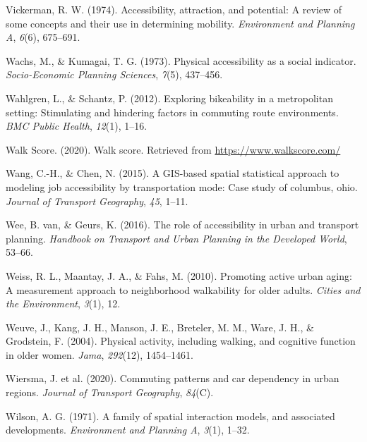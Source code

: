 \documentclass[12pt,twoside]{reedthesis}
\newlength{\cslhangindent}
\newenvironment{CSLReferences}[2] %
 {%
  \setlength{\parindent}{0pt}
  \ifodd #1 \everypar{\setlength{\hangindent}{\cslhangindent}}\ignorespaces\fi
  \ifnum #2 > 0
  \setlength{\parskip}{#2\baselineskip}
  \fi
 }%
 {}
\begin{document}
\begin{CSLReferences}{1}{0}
\leavevmode{}%
Vickerman, R. W. (1974). Accessibility, attraction, and potential: A review of some concepts and their use in determining mobility. \emph{Environment and Planning A}, \emph{6}(6), 675--691.

\leavevmode{}%
Wachs, M., \& Kumagai, T. G. (1973). Physical accessibility as a social indicator. \emph{Socio-Economic Planning Sciences}, \emph{7}(5), 437--456.

\leavevmode{}%
Wahlgren, L., \& Schantz, P. (2012). Exploring bikeability in a metropolitan setting: Stimulating and hindering factors in commuting route environments. \emph{BMC Public Health}, \emph{12}(1), 1--16.

\leavevmode{}%
Walk Score. (2020). Walk score. Retrieved from \url{https://www.walkscore.com/}

\leavevmode{}%
Wang, C.-H., \& Chen, N. (2015). A GIS-based spatial statistical approach to modeling job accessibility by transportation mode: Case study of columbus, ohio. \emph{Journal of Transport Geography}, \emph{45}, 1--11.

\leavevmode{}%
Wee, B. van, \& Geurs, K. (2016). The role of accessibility in urban and transport planning. \emph{Handbook on Transport and Urban Planning in the Developed World}, 53--66.

\leavevmode{}%
Weiss, R. L., Maantay, J. A., \& Fahs, M. (2010). Promoting active urban aging: A measurement approach to neighborhood walkability for older adults. \emph{Cities and the Environment}, \emph{3}(1), 12.

\leavevmode{}%
Weuve, J., Kang, J. H., Manson, J. E., Breteler, M. M., Ware, J. H., \& Grodstein, F. (2004). Physical activity, including walking, and cognitive function in older women. \emph{Jama}, \emph{292}(12), 1454--1461.

\leavevmode{}%
Wiersma, J. et al. (2020). Commuting patterns and car dependency in urban regions. \emph{Journal of Transport Geography}, \emph{84}(C).

\leavevmode{}%
Wilson, A. G. (1971). A family of spatial interaction models, and associated developments. \emph{Environment and Planning A}, \emph{3}(1), 1--32.


\end{CSLReferences}
\end{document}
